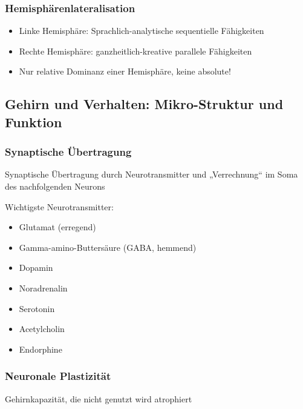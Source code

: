 \subsubsection{Hemisphärenlateralisation}
\begin{itemize}
	\item Linke Hemisphäre: Sprachlich-analytische
			sequentielle Fähigkeiten
	\item Rechte Hemisphäre: ganzheitlich-kreative
			parallele Fähigkeiten
	\item Nur relative
			Dominanz einer Hemisphäre, keine
			absolute!
\end{itemize}
\subsection{Gehirn und Verhalten: Mikro-Struktur und Funktion}
\subsubsection{Synaptische Übertragung}
Synaptische Übertragung durch Neurotransmitter und „Verrechnung“ im Soma des nachfolgenden Neurons

Wichtigste Neurotransmitter:
\begin{itemize}
	\item Glutamat (erregend)
	\item Gamma-amino-Buttersäure (GABA, hemmend)
	\item Dopamin
	\item Noradrenalin
	\item Serotonin
	\item Acetylcholin
	\item Endorphine
\end{itemize}

\subsubsection{Neuronale Plastizität}
Gehirnkapazität, die nicht genutzt wird atrophiert


















